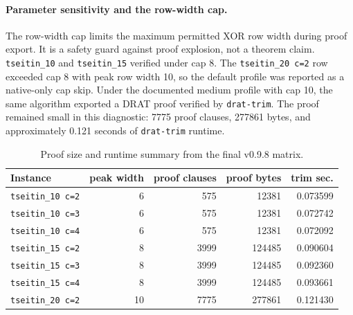 \documentclass[10pt]{article}
\begin{document}
\begin{table}[t]
\centering
\small
\caption{Row-width cap sensitivity for \texttt{tseitin\_20 c=2}.}
\end{table}

\paragraph{Parameter sensitivity and the row-width cap.}
The row-width cap limits the maximum permitted XOR row width during proof
export. It is a safety guard against proof explosion, not a theorem claim.
\texttt{tseitin\_10} and \texttt{tseitin\_15} verified under cap 8. The
\texttt{tseitin\_20 c=2} row exceeded cap 8 with peak row width 10, so the
default profile was reported as a native-only cap skip. Under the documented
medium profile with cap 10, the same algorithm exported a DRAT proof verified
by \texttt{drat-trim}. The proof remained small in this diagnostic: 7775 proof
clauses, 277861 bytes, and approximately 0.121 seconds of \texttt{drat-trim}
runtime.

\begin{table}[t]
\centering
\small
\caption{Proof size and runtime summary from the final v0.9.8 matrix.}
\begin{tabular}{lrrrr}
\toprule
Instance & peak width & proof clauses & proof bytes & trim sec. \\
\midrule
\texttt{tseitin\_10 c=2} & 6 & 575 & 12381 & 0.073599 \\
\texttt{tseitin\_10 c=3} & 6 & 575 & 12381 & 0.072742 \\
\texttt{tseitin\_10 c=4} & 6 & 575 & 12381 & 0.072092 \\
\texttt{tseitin\_15 c=2} & 8 & 3999 & 124485 & 0.090604 \\
\texttt{tseitin\_15 c=3} & 8 & 3999 & 124485 & 0.092360 \\
\texttt{tseitin\_15 c=4} & 8 & 3999 & 124485 & 0.093661 \\
\texttt{tseitin\_20 c=2} & 10 & 7775 & 277861 & 0.121430 \\
\bottomrule
\end{tabular}
\end{table}
\end{document}
